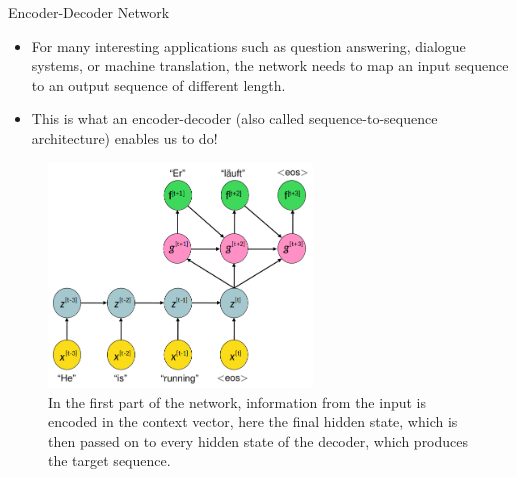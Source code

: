 \begin{vbframe}{Encoder-Decoder Network}
  \begin{itemize}
    \item For many interesting applications such as question answering, dialogue systems, or machine translation, the network needs to map an input sequence to an output sequence of different length.
    \item This is what an encoder-decoder (also called sequence-to-sequence architecture) enables us to do!
    
    \end{itemize}
 
 \framebreak
 
  \begin{figure}
    \includegraphics[width=7cm]{figure/seq2seq_2.png}
    \caption{%
    In the first part of the network, information from the input is encoded in the context vector, here the final hidden state, which is then passed on to every hidden state of the decoder, which produces the target sequence.}
  \end{figure} 
    
    
    \begin{itemize}
   

\end{itemize}
\end{vbframe}
